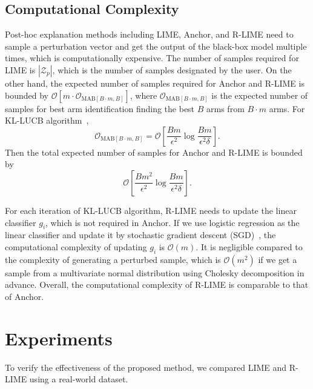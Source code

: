\documentclass[runningheads]{llncs}
\begin{document}

\subsection{Computational Complexity}
Post-hoc explanation methods including LIME, Anchor, and R-LIME
need to sample a perturbation vector
and get the output of the black-box model multiple times,
which is computationally expensive.
The number of samples required for LIME is $|\mathcal{Z}_p|$,
which is the number of samples designated by the user.
On the other hand,
the expected number of samples required for Anchor and R-LIME is bounded by
$\mathcal{O}[m\cdot\mathcal{O}_{\mathrm{MAB}[B\cdot m,B]}]$,
where $\mathcal{O}_{\mathrm{MAB}[B\cdot m,B]}$
is the expected number of samples
for best arm identification finding the best $B$ arms from $B\cdot m$ arms.
For KL-LUCB algorithm~\cite{kaufmann2013information},
\begin{equation}
  \mathcal{O}_{\mathrm{MAB}[B\cdot m,B]}=
  \mathcal{O}\left[\frac{Bm}{\epsilon^2}\log\frac{Bm}{\epsilon^2\delta}\right].
\end{equation}
Then the total expected number of samples for Anchor and R-LIME is bounded by
\begin{equation}
  \mathcal{O}\left[\frac{Bm^2}{\epsilon^2}\log\frac{Bm}{\epsilon^2\delta}\right].
\end{equation}

For each iteration of KL-LUCB algorithm, R-LIME needs to update
the linear classifier $g_i$, which is not required in Anchor.
If we use logistic regression as the linear classifier and update it
by stochastic gradient descent (SGD)~\cite{robbins1951stochastic},
the computational complexity of updating $g_i$ is $\mathcal{O}(m)$.
It is negligible compared to the complexity of generating a perturbed sample,
which is $\mathcal{O}(m^2)$ if we get a sample
from a multivariate normal distribution using Cholesky decomposition in advance.
Overall, the computational complexity of R-LIME is comparable to that of Anchor.

\section{Experiments}
To verify the effectiveness of the proposed method,
we compared LIME and R-LIME using a real-world dataset.
\end{document}

